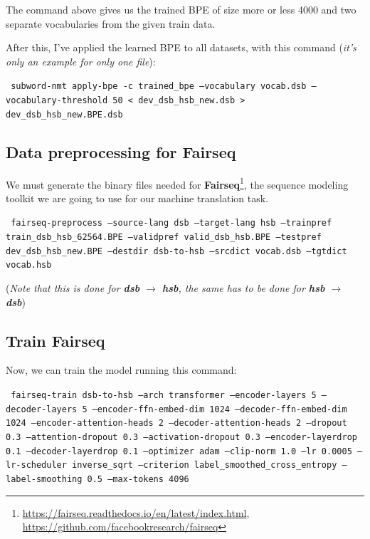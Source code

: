 \documentclass[12pt]{article}
\begin{document}
The command above gives us the trained BPE of size more or less 4000 and two separate vocabularies from the given train data.

After this, I've applied the learned BPE to all datasets, with this command (\textit{it's only an example for only one file}):

\vspace{0.5cm}
\texttt{
  subword-nmt apply-bpe -c trained\_bpe --vocabulary vocab.dsb --vocabulary-threshold 50 < dev\_dsb\_hsb\_new.dsb > dev\_dsb\_hsb\_new.BPE.dsb
}

\subsection{Data preprocessing for Fairseq}
We must generate the binary files needed for \textbf{Fairseq}\footnote{\href{https://fairseq.readthedocs.io/en/latest/index.html}{https://fairseq.readthedocs.io/en/latest/index.html}, \href{https://github.com/facebookresearch/fairseq}{https://github.com/facebookresearch/fairseq}}, the sequence modeling toolkit we are going to use for our machine translation task.

\vspace{0.5cm}
\texttt{
    fairseq-preprocess --source-lang dsb --target-lang hsb --trainpref train\_dsb\_hsb\_62564.BPE --validpref valid\_dsb\_hsb.BPE --testpref dev\_dsb\_hsb\_new.BPE --destdir dsb-to-hsb --srcdict vocab.dsb --tgtdict vocab.hsb
}

\vspace{0.2cm}
{\centering
(\textit{Note that this is done for \textbf{dsb} $\rightarrow$ \textbf{hsb}, the same has to be done for \textbf{hsb} $\rightarrow$ \textbf{dsb}})\par
}

\subsection{Train Fairseq}
Now, we can train the model running this command:

\vspace{0.2cm}
\texttt{
fairseq-train dsb-to-hsb --arch transformer --encoder-layers 5 --decoder-layers 5 --encoder-ffn-embed-dim 1024 --decoder-ffn-embed-dim 1024 --encoder-attention-heads 2 --decoder-attention-heads 2 --dropout 0.3 --attention-dropout 0.3 --activation-dropout 0.3 --encoder-layerdrop 0.1 --decoder-layerdrop 0.1 --optimizer adam --clip-norm 1.0 --lr 0.0005 --lr-scheduler inverse\_sqrt --criterion label\_smoothed\_cross\_entropy --label-smoothing 0.5 --max-tokens 4096}
\end{document}
